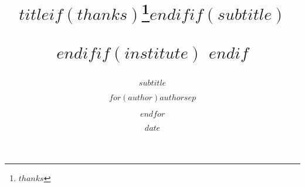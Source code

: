 \documentclass[$if(fontsize)$$fontsize$,$endif$$if(lang)$$babel-lang$,$endif$$if(papersize)$$papersize$paper,$endif$$for(classoption)$$classoption$$sep$,$endfor$]{$documentclass$}
\title{$title$$if(thanks)$\thanks{$thanks$}$endif$$if(subtitle)$%
    \subtitle{$subtitle$}$endif$$if(institute)$\institute{$institute$}%
    $endif$}
\author{$for(author)$$author$$sep$ \and $endfor$}
\institute{$for(institute)$$institute$$sep$ \and $endfor$}
\date{$date$}
\renewenvironment{abstract}{%
    \clearpage\small
    \null\vfil
    \begin{center}%
        {\bfseries \abstractname\vspace{-.5em}\vspace{0pt}}%
    \end{center}%
    \quotation
    }
\begin{document}
  $if(title)$
    \maketitle
  $endif$
  \begin{titlepage}
  \end{titlepage}


  $if(abstracten)$
    \begin{abstract}
      $abstracten$
    \end{abstract}
  $endif$  

   $if(keywordsen)$
    \vfill
    \textbf{Keywords:}$for(keywordsen)$ $keywordsen$ $sep$,$endfor$.
  $endif$

  $if(abstractes)$
    \begin{abstract}
      $abstractes$
    \end{abstract}
  $endif$  

  $if(keywordses)$
    \vfill
    \textbf{Keywords:}$for(keywordses)$ $keywordses$ $sep$,$endfor$.
  $endif$

  $for(include-before)$
    $include-before$
  $endfor$

  $if(toc)${
    $if(colorlinks)$
      \hypersetup{linkcolor=$if(toccolor)$$toccolor$$else$black$endif$}
    $endif$
    \setcounter{tocdepth}{$toc-depth$}
    \tableofcontents
  }
  $endif$
  $if(lot)$
    \listoftables
  $endif$
  $if(lof)$
    \listoffigures
  $endif$
  $body$

  $if(natbib)$
  $if(bibliography)$
  $if(biblio-title)$
  $if(book-class)$
    \renewcommand\bibname{$biblio-title$}
  $else$
    \renewcommand\refname{$biblio-title$}
  $endif$
  $endif$
  

  $endif$
  $endif$
  $if(biblatex)$
    \printbibliography$if(biblio-title)$[title=$biblio-title$]$endif$
  $endif$
  $if(include-after)$
    \appendix
    $for(include-after)$
      $include-after$
    $endfor$
  $endif$
\end{document}

